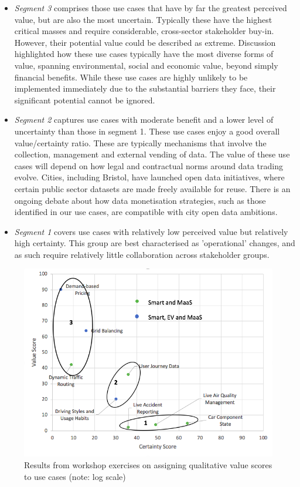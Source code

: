 \documentclass[b5paper,10pt]{article}
\begin{document}
\begin{itemize}
\item {\emph{Segment 3}} comprises those use cases that have by far
the greatest perceived value, but are also the most
uncertain. Typically these have the highest critical masses and
require considerable, cross-sector stakeholder buy-in. However, their
potential value could be described as extreme. Discussion highlighted
how these use cases typically have the most diverse forms of value,
spanning environmental, social and economic value, beyond simply
financial benefits. While these use cases are highly unlikely to be
implemented immediately due to the substantial barriers they face,
their significant potential cannot be ignored.
\item {\emph{Segment 2}} captures use cases with moderate benefit and
a lower level of uncertainty than those in segment 1. These use cases
enjoy a good overall value/certainty ratio. These are typically
mechanisms that involve the collection, management and external
vending of data. The value of these use cases will depend on how legal
and contractual norms around data trading evolve. Cities, including
Bristol, have launched open data initiatives, where certain public
sector datasets are made freely available for reuse. There is an
ongoing debate about how data monetisation strategies, such as those
identified in our use cases, are compatible with city open data
ambitions.
\item {\emph{Segment 1}} covers use cases with relatively low
perceived value but relatively high certainty. This group are best
characterised as 'operational' changes, and as such require relatively
little collaboration across stakeholder groups.
\end{itemize}

\begin{figure}[!h]
\centering
\includegraphics[width=0.75\columnwidth]{images/valuegraph.png}
\caption{Results from workshop exercises on assigning qualitative
value scores to use cases (note: log scale)}
\label{fig:valuegraph}
\end{figure}
\end{document}
